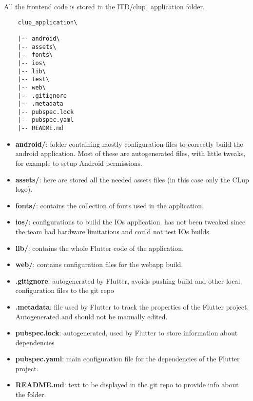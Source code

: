 All the frontend code is stored in the ITD/clup\_application folder.

\begin{lstlisting}
    clup_application\

    |-- android\
    |-- assets\
    |-- fonts\
    |-- ios\
    |-- lib\
    |-- test\
    |-- web\
    |-- .gitignore
    |-- .metadata
    |-- pubspec.lock
    |-- pubspec.yaml
    |-- README.md 

\end{lstlisting}

\begin{itemize}
    \item \textbf{android/}: folder containing mostly configuration files to correctly build the android application. Most of these are autogenerated files, with little tweaks, for example to setup Android permissions.
    \item \textbf{assets/}: here are stored all the needed assets files (in this case only the CLup logo).
    \item \textbf{fonts/}: contains the collection of fonts used in the application.
    \item \textbf{ios/}: configurations to build the IOs application. has not been tweaked since the team had hardware limitations and could not test IOs builds.
    \item \textbf{lib/}: contains the whole Flutter code of the application.
    \item \textbf{web/}: contains configuration files for the webapp build.
    \item \textbf{.gitignore}: autogenerated by Flutter, avoids pushing build and other local configuration files to the git repo
    \item \textbf{.metadata}: file used by Flutter to track the properties of the Flutter project. Autogenerated and should not be manually edited.
    \item \textbf{pubspec.lock}: autogenerated, used by Flutter to store information about dependencies
    \item \textbf{pubspec.yaml}: main configuration file for the dependencies of the Flutter project.
    \item \textbf{README.md}: text to be displayed in the git repo to provide info about the folder.
\end{itemize}



